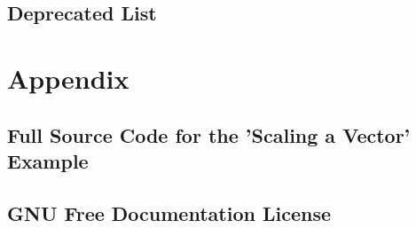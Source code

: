 \documentclass{book}
\begin{document}







































\chapter{Deprecated List}
\label{deprecated}
\hypertarget{deprecated}{}



\printindex

\part{Appendix}

\chapter{Full Source Code for the ’Scaling a Vector’ Example}
\label{FullSourceCodeVectorScal}
\hypertarget{FullSourceCodeVectorScal}{}


\chapter{GNU Free Documentation License}
\label{GNUFreeDocumentationLicense}
\hypertarget{GNUFreeDocumentationLicense}{}

\end{document}
